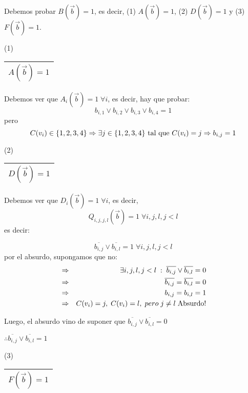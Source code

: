 \documentclass[12pt,a4paper]{report}
\newcounter{neq}
\begin{document}
		Debemos probar $B(\overrightarrow{b}) = 1$, es decir, (1) $A(\overrightarrow{b}) = 1$, (2) $D(\overrightarrow{b}) = 1$ y (3) $F(\overrightarrow{b}) = 1$.

		\vspace{3mm}
		(1) \begin{tabular}{|c|} \hline $A(\overrightarrow{b}) = 1$ \\ \hline \end{tabular}

		Debemos ver que $A_{i}(\overrightarrow{b}) = 1 \; \forall i$, es decir, hay que probar:
		\[ b_{i, 1} \vee b_{i, 2} \vee b_{i, 3} \vee b_{i, 4} = 1 \]
		pero
		\[ C(v_{i}) \in \lbrace 1, 2, 3, 4 \rbrace \Rightarrow \exists j \in \lbrace 1, 2, 3, 4 \rbrace \textup{ tal que } C(v_{i}) = j \Rightarrow b_{i, j} = 1\]

		\vspace{3mm}
		(2) \begin{tabular}{|c|} \hline $D(\overrightarrow{b}) = 1$ \\ \hline \end{tabular}

		Debemos ver que $D_{i}(\overrightarrow{b}) = 1 \; \forall i$, es decir,
		\[ Q_{i, j, j, l}(\overrightarrow{b}) = 1 \; \forall i, j, l,  j < l \] es decir:

		\[ \overline{b_{i, j}} \vee \overline{b_{i, l}} = 1 \; \forall i, j, l, j <  l\]
		por el absurdo, supongamos que no:
		\begin{eqnarray}
			\nonumber &\Rightarrow & \exists i, j, l, j < l \; : \; \overline{b_{i, j}} \vee \overline{b_{i, l}} = 0 \\
			\nonumber &\Rightarrow & \overline{b_{i, j}} = \overline{b_{i, l}} = 0 \\
			\nonumber &\Rightarrow & b_{i, j} = b_{i, l} = 1 \\
			\nonumber &\Rightarrow & C(v_{i}) = j, \; C(v_{i}) = l, \; pero \; j \neq l \; \textup{Absurdo!}
		\end{eqnarray}

		Luego, el absurdo vino de suponer que $\overline{b_{i, j}} \vee \overline{b_{i, l}} = 0$

		\vspace{3mm}
		$\therefore \overline{b_{i, j}} \vee \overline{b_{i, l}} = 1$

		\vspace{3mm}
		(3) \begin{tabular}{|c|} \hline $F(\overrightarrow{b}) = 1$ \\ \hline \end{tabular}
		\vspace{3mm}
\end{document}
